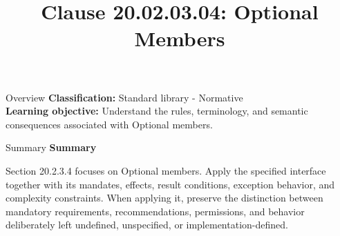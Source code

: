 \documentclass[10pt,letterpaper]{article}
\title{Clause 20.02.03.04: Optional Members}
\author{}
\date{}
\begin{document}
\maketitle
\begin{CornellOverviewBox}{Overview}
\textbf{Classification:} Standard library - Normative\\[2pt]
\textbf{Learning objective:} Understand the rules, terminology, and semantic consequences associated with Optional members.
\end{CornellOverviewBox}\begin{CornellSummaryBox}{Summary}
{\sffamily\bfseries\color{Accent} Summary}\par\vspace{3pt}Section 20.2.3.4 focuses on Optional members. Apply the specified interface together with its mandates, effects, result conditions, exception behavior, and complexity constraints. When applying it, preserve the distinction between mandatory requirements, recommendations, permissions, and behavior deliberately left undefined, unspecified, or implementation-defined.
\end{CornellSummaryBox}
\end{document}
